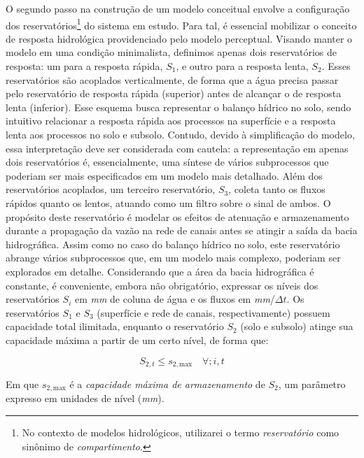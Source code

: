 \documentclass[./main.tex]{subfiles}
\begin{document}
\par O segundo passo na construção de um modelo conceitual envolve a configuração dos reservatórios\footnote{No contexto de modelos hidrológicos, utilizarei o termo \textit{reservatório} como sinônimo de \textit{compartimento}.} do sistema em estudo. Para tal, é essencial mobilizar o conceito de resposta hidrológica providenciado pelo modelo perceptual. Visando manter o modelo em uma condição minimalista, definimos apenas dois reservatórios de resposta: um para a resposta rápida, $S_1$, e outro para a resposta lenta, $S_2$. Esses reservatórios são acoplados verticalmente, de forma que a água precisa passar pelo reservatório de resposta rápida (superior) antes de alcançar o de resposta lenta (inferior). Esse esquema busca representar o balanço hídrico no solo, sendo intuitivo relacionar a resposta rápida aos processos na superfície e a resposta lenta aos processos no solo e subsolo. Contudo, devido à simplificação do modelo, essa interpretação deve ser considerada com cautela: a representação em apenas dois reservatórios é, essencialmente, uma síntese de vários subprocessos que poderiam ser mais especificados em um modelo mais detalhado. Além dos reservatórios acoplados, um terceiro reservatório, $S_3$, coleta tanto os fluxos rápidos quanto os lentos, atuando como um filtro sobre o sinal de ambos. O propósito deste reservatório é modelar os efeitos de atenuação e armazenamento durante a propagação da vazão na rede de canais antes se atingir a saída da bacia hidrográfica. Assim como no caso do balanço hídrico no solo, este reservatório abrange vários subprocessos que, em um modelo mais complexo, poderiam ser explorados em detalhe. Considerando que a área da bacia hidrográfica é constante, é conveniente, embora não obrigatório, expressar os níveis dos reservatórios $S_i$ em \textit{mm} de coluna de água e os fluxos em \textit{mm}/$\Delta t$. Os reservatórios $S_1$ e $S_3$ (superfície e rede de canais, respectivamente) possuem capacidade total ilimitada, enquanto o reservatório $S_2$ (solo e subsolo) atinge sua capacidade máxima a partir de um certo nível, de forma que:
\begin{linenomath*}
\begin{equation}
\label{eq:max_capacity}
S_{2, t} \leq s_{2,\text{max}} \quad \forall ; i, t
\end{equation}
\end{linenomath*}
Em que $s_{2, \text{max}}$ é a \textit{capacidade máxima de armazenamento} de $S_2$, um parâmetro expresso em unidades de nível (\textit{mm}).
\end{document}
